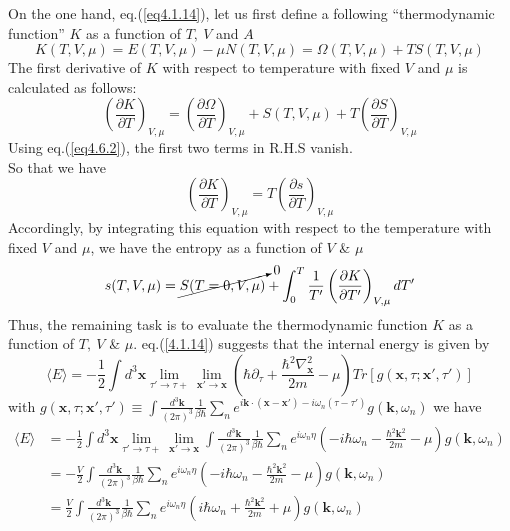 On the one hand, eq.(\ref{eq4.1.14}), let us first define a following ``thermodynamic function'' $K$ as a function of $T,\ V$ and $A$
\begin{equation}
K(T,V,\mu)=E(T,V,\mu)-\mu N(T,V,\mu)=\Omega(T,V,\mu)+TS(T,V,\mu)
\end{equation}
The first derivative of $K$ with respect to temperature with fixed $V$ and $\mu$ is calculated as follows:
\[
\left( \frac{\partial K}{\partial T}\right)_{V,\mu}=\left( \frac{\partial \Omega}{\partial T}\right)_{V,\mu}+S(T,V,\mu)+T\left( \frac{\partial S}{\partial T}\right)_{V,\mu}
\]
Using eq.(\ref{eq4.6.2}), the first two terms in R.H.S vanish.\\
So that we have
\begin{equation}
\left( \frac{\partial K}{\partial T}\right)_{V,\mu}=T\left( \frac{\partial s}{\partial T}\right)_{V,\mu}
\end{equation}
Accordingly, by integrating this equation with respect to the temperature with fixed $V$ and $\mu$, we have the entropy as a function of $V$ \& $\mu$
\begin{equation}
s(T,V,\mu)=\cancelto{0}{S(T=0,V,\mu)}+\int_0^T\frac{1}{T'}\left( \frac{\partial K}{\partial T'}\right)_{V,\mu} dT'
\end{equation}
Thus, the remaining task is to evaluate the thermodynamic function $K$ as a function of $T,\ V$ \& $\mu$.
eq.(\ref{4.1.14}) suggests that the internal energy is given by
\[
\langle E \rangle=-\frac{1}{2}\int d^3\mathbf{x} \lim_{\tau'\to \tau+} \lim_{\mathbf{x}'\to\mathbf{x}}\left(\hbar \partial_\tau +\frac{\hbar^2\nabla^2_\mathbf{x}}{2m}-\mu\right) Tr[g(\mathbf{x},\tau;\mathbf{x}',\tau')]
\]
with $g(\mathbf{x},\tau;\mathbf{x}',\tau')\equiv\int \frac{d^3\mathbf{k}}{(2\pi)^3}\frac{1}{\beta\hbar}\sum_n e^{i\mathbf{k}\cdot(\mathbf{x}-\mathbf{x}')-i\omega_n(\tau-\tau')}g(\mathbf{k},\omega_n)$
we have 
\begin{equation}\label{eq4.6.9}
\begin{aligned}
\langle E \rangle&=-\frac{1}{2}\int d^3 \mathbf{x} \lim_{\tau'\to \tau+} \lim_{\mathbf{x}'\to\mathbf{x}} \int \frac{d^3 \mathbf{k}}{(2\pi)^3} \frac{1}{\beta\hbar} \sum_n e^{i\omega_n \eta}\left(-i\hbar\omega_n-\frac{\hbar^2\mathbf{k}^2}{2m}-\mu\right)g(\mathbf{k},\omega_n)\\
&=-\frac{V}{2} \int \frac{d^3 \mathbf{k}}{(2\pi)^3} \frac{1}{\beta\hbar} \sum_n e^{i\omega_n \eta}\left(-i\hbar\omega_n-\frac{\hbar^2\mathbf{k}^2}{2m}-\mu\right)g(\mathbf{k},\omega_n)\\
&=\frac{V}{2} \int \frac{d^3 \mathbf{k}}{(2\pi)^3} \frac{1}{\beta\hbar} \sum_n e^{i\omega_n \eta}\left(i\hbar\omega_n+\frac{\hbar^2\mathbf{k}^2}{2m}+\mu\right)g(\mathbf{k},\omega_n)
\end{aligned}
\end{equation}
